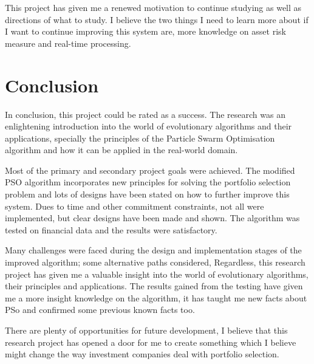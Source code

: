   This project has given me a renewed motivation to continue studying as well as directions of what to study. I believe the two things I need to learn more about if I want to continue improving this system are, more knowledge on asset risk measure and real-time processing. 

  \section{Conclusion} %
  \label{sec:conclusion}
  In conclusion, this project could be rated as a success. The research was an enlightening introduction into the world of evolutionary algorithms and their applications, specially the principles of the Particle Swarm Optimisation algorithm and how it can be applied in the real-world domain.

  Most of the primary and secondary project goals were achieved. The modified PSO algorithm incorporates new principles for solving the portfolio selection problem and lots of designs have been stated on how to further improve this system. Dues to time and other commitment constraints, not all were implemented, but clear designs have been made and shown. The algorithm was tested on financial data and the results were satisfactory.

  Many challenges were faced during the design and implementation stages of the improved algorithm; some alternative paths considered, Regardless, this research project has given me a valuable insight into the world of evolutionary algorithms, their principles and applications. The results gained from the testing have given me a more insight knowledge on the algorithm, it has taught me new facts about PSo and confirmed some previous known facts too.

  There are plenty of opportunities for future development, I believe that this research project has opened a door for me to create something which I believe might change the way investment companies deal with portfolio selection.
  


